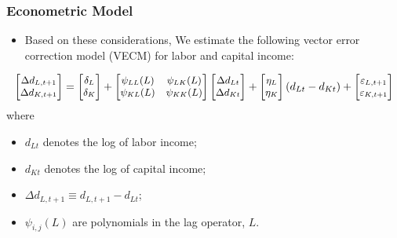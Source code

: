 \documentclass[10pt]{beamer}
\begin{document}
\begin{frame}[c]\frametitle{Econometric Model}
\begin{itemize}
    \item Based on these considerations, We estimate the following vector error correction model (VECM) for labor and capital income:
\end{itemize}
\begin{equation*}\small
    \begin{bmatrix}
    \Delta d_{L,t+1}\\
    \Delta d_{K,t+1}
    \end{bmatrix}
    =
    \begin{bmatrix}
    \delta_{L}\\
    \delta_{K}
    \end{bmatrix}
    +\begin{bmatrix}
    \psi_{LL}(L) & \psi_{LK}(L)\\
    \psi_{KL}(L) & \psi_{KK}(L)
    \end{bmatrix}\begin{bmatrix}
    \Delta d_{Lt}\\
    \Delta d_{Kt}
    \end{bmatrix}+\begin{bmatrix}
    \eta_{L}\\
    \eta_{K}
    \end{bmatrix}(d_{Lt}-d_{Kt}) + \begin{bmatrix}\varepsilon_{L,t+1}\\ \varepsilon_{K,t+1}\end{bmatrix}
\end{equation*}
where
\begin{itemize}
    \item $d_{Lt}$ denotes the log of labor income;
    \item $d_{Kt}$ denotes the log of capital income;
    \item $\Delta d_{L,t+1} \equiv d_{L,t+1}-d_{Lt}$;
    \item $\psi_{i,j}(L)$ are polynomials in the lag operator, $L$.
\end{itemize}

\end{frame}
\end{document}
